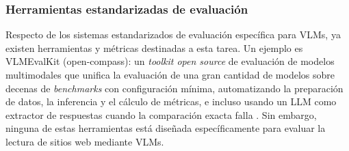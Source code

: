 \subsubsection{Herramientas estandarizadas de evaluación}

Respecto de los sistemas estandarizados de evaluación específica para VLMs, ya existen herramientas y métricas destinadas a esta tarea. Un ejemplo es VLMEvalKit (open-compass): un \textit{toolkit open source} de evaluación de modelos multimodales que unifica la evaluación de una gran cantidad de modelos sobre decenas de \textit{benchmarks} con configuración mínima, automatizando la preparación de datos, la inferencia y el cálculo de métricas, e incluso usando un LLM como extractor de respuestas cuando la comparación exacta falla \cite{duan2024vlmevalkit}. Sin embargo, ninguna de estas herramientas está diseñada específicamente para evaluar la lectura de sitios web mediante VLMs.